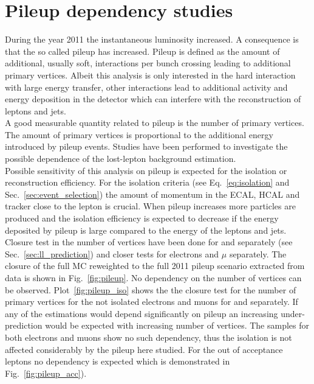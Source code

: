 \section{Pileup dependency studies}
\label{sec:pileup}
During the year 2011 the instantaneous luminosity increased. A consequence is that the so called pileup has increased. Pileup is defined as the amount of additional, usually soft, interactions per bunch crossing leading to additional primary vertices. Albeit this analysis is only interested in the hard interaction with large energy transfer, other interactions lead to additional activity and energy deposition in the detector which can interfere with the reconstruction of leptons and jets.\\
A good measurable quantity related to pileup is the number of primary vertices. The amount of primary vertices is proportional to the additional energy introduced by pileup events. Studies have been performed to investigate the possible dependence of the lost-lepton background estimation.\\
Possible sensitivity of this analysis on pileup is expected for the isolation or reconstruction efficiency. For the isolation criteria (see Eq.~\ref{eq:isolation} and Sec.~\ref{sec:event_selection}) the amount of momentum in the ECAL, HCAL and tracker close to the lepton is crucial. When pileup increases more particles are produced and the isolation efficiency is expected to decrease if the energy deposited by pileup is large compared to the energy of the leptons and jets.\\
Closure test in the number of vertices have been done for \ttbar and \wpj separately (see Sec.~\ref{sec:ll_prediction}) and closer tests for electrons and $\mu$ separately. The closure of the full MC reweighted to the full 2011 pileup scenario extracted from data is shown in Fig.~\ref{fig:pileup}. No dependency on the number of vertices can be observed. Plot~\ref{fig:pileup_iso} shows the the closure test for the number of primary vertices for the not isolated electrons and muons for \ttbar and \wpj separately. If any of the estimations would depend significantly on pileup an increasing under-prediction would be expected with increasing number of vertices. The samples for both electrons and muons show no such dependency, thus the isolation is not affected considerably by the pileup here studied. For the out of acceptance leptons no dependency is expected which is demonstrated in Fig.~\ref{fig:pileup_acc}).
